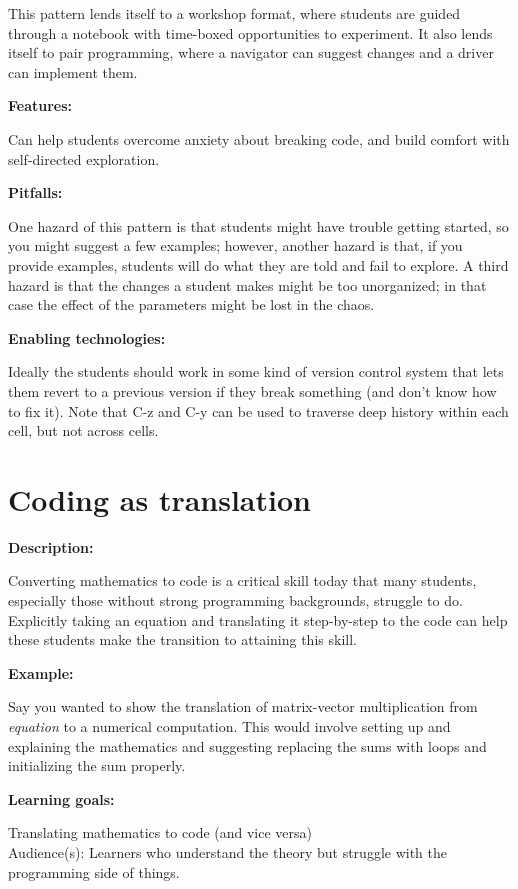 \documentclass[]{book}
\begin{document}
This pattern lends itself to a workshop format, where students are
guided through a notebook with time-boxed opportunities to experiment.
It also lends itself to pair programming, where a navigator can suggest
changes and a driver can implement them.

\textbf{Features:}

Can help students overcome anxiety about breaking code, and build
comfort with self-directed exploration.

\textbf{Pitfalls:}

One hazard of this pattern is that students might have trouble getting
started, so you might suggest a few examples; however, another hazard is
that, if you provide examples, students will do what they are told and
fail to explore. A third hazard is that the changes a student makes
might be too unorganized; in that case the effect of the parameters
might be lost in the chaos.

\textbf{Enabling technologies:}

Ideally the students should work in some kind of version control system
that lets them revert to a previous version if they break something (and
don't know how to fix it). Note that C-z and C-y can be used to traverse
deep history within each cell, but not across cells.

\section{Coding as translation}\label{coding-as-translation}

\textbf{Description:}

Converting mathematics to code is a critical skill today that many
students, especially those without strong programming backgrounds,
struggle to do. Explicitly taking an equation and translating it
step-by-step to the code can help these students make the transition to
attaining this skill.

\textbf{Example:}

Say you wanted to show the translation of matrix-vector multiplication
from \emph{equation} to a numerical computation. This would involve
setting up and explaining the mathematics and suggesting replacing the
sums with loops and initializing the sum properly.

\textbf{Learning goals:}

Translating mathematics to code (and vice versa)\\
Audience(s): Learners who understand the theory but struggle with the
programming side of things.
\end{document}
